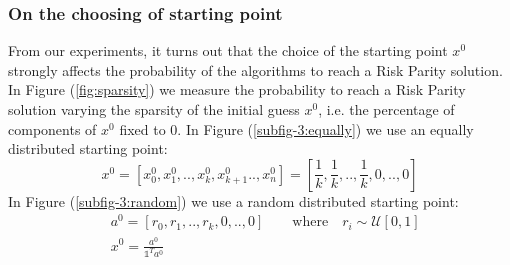 \subsubsection{On the choosing of starting point}
From our experiments, it turns out that the choice of the starting point $x^0$ strongly affects the probability of the algorithms to reach a Risk Parity solution.  In Figure (\ref{fig:sparsity}) we measure the probability to reach a Risk Parity solution varying the sparsity of the initial guess $x^0$, i.e. the percentage of components of $x^0$ fixed to 0. In Figure (\ref{subfig-3:equally}) we use an equally distributed starting point:
\begin{equation}
x^{0} = \left[x^{0}_0, x^{0}_1, .. ,  x^{0}_k, x^{0}_{k+1} .., x^{0}_n \right] = \left[\frac{1}{k}, \frac{1}{k}, .., \frac{1}{k}, 0, .., 0 \right]
\end{equation}
In Figure (\ref{subfig-3:random}) we use a random distributed starting point:
\begin{equation}
\begin{aligned}
&a^{0} = \left[r_0, r_1, ..,r_k, 0, .., 0 \right] \qquad \text{where} \quad r_i \sim \mathcal{U}[0,1]\\
&x^0 = \frac{a^{0}}{\mathds{1}^T a^0}
\end{aligned}
\end{equation}

